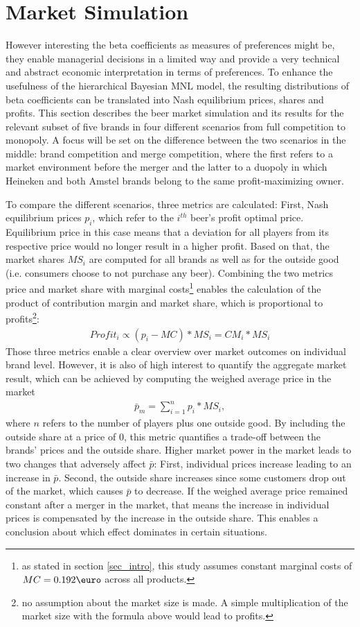 \documentclass[12pt,a4paper]{article}
\begin{document}
\section{Market Simulation} \label{sec_marketsim}

However interesting the beta coefficients as measures of preferences might be, they enable managerial decisions in a limited way and provide a very technical and abstract economic interpretation in terms of preferences.
To enhance the usefulness of the hierarchical Bayesian MNL model, the resulting distributions of beta coefficients can be translated into Nash equilibrium prices, shares and profits.
This section describes the beer market simulation and its results for the relevant subset of five brands in four different scenarios from full competition to monopoly.
A focus will be set on the difference between the two scenarios in the middle: brand competition and merge competition, where the first refers to a market environment before the merger and the latter to a duopoly in which Heineken and both Amstel brands belong to the same profit-maximizing owner.

To compare the different scenarios, three metrics are calculated: First, Nash equilibrium prices $p_i$, which refer to the $i^{th}$ beer's profit optimal price.
Equilibrium price in this case means that a deviation for all players from its respective price would no longer result in a higher profit.
Based on that, the market shares $MS_i$ are computed for all brands as well as for the outside good (i.e. consumers choose to not purchase any beer).
Combining the two metrics price and market share with marginal costs\footnote{as stated in section \ref{sec_intro}, this study assumes constant marginal costs of $MC = 0.192 \text{\euro}$ across all products.} enables the calculation of the product of contribution margin and market share, which is proportional to profits\footnote{no assumption about the market size is made. A simple multiplication of the market size with the formula above would lead to profits.}:
\begin{align*}
Profit_i \propto (p_i - MC) * MS_i = CM_i * MS_i
\end{align*}
Those three metrics enable a clear overview over market outcomes on individual brand level.
However, it is also of high interest to quantify the aggregate market result, which can be achieved by computing the weighed average price in the market 
\begin{align*}
\bar{p}_m = \sum_{i=1}^n{p_i * MS_i},
\end{align*}
where $n$ refers to the number of players plus one outside good.
By including the outside share at a price of 0, this metric quantifies a trade-off between the brands' prices and the outside share.
Higher market power in the market leads to two changes that adversely affect $\bar{p}$: First, individual prices increase leading to an increase in $\bar{p}$.
Second, the outside share increases since some customers drop out of the market, which causes $\bar{p}$ to decrease.
If the weighed average price remained constant after a merger in the market, that means the increase in individual prices is compensated by the increase in the outside share.
This enables a conclusion about which effect dominates in certain situations.
\end{document}
